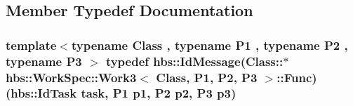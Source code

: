 \subsection{Member Typedef Documentation}
\hypertarget{structhbs_1_1_work_spec_1_1_work3_ac7ae1afe6f16d96d1832caaf6bd4a3d1}{
\subsubsection[{Func}]{\setlength{\rightskip}{0pt plus 5cm}template$<$typename Class , typename P1 , typename P2 , typename P3 $>$ typedef {\bf hbs\-::\-Id\-Message}(Class\-::$\ast$ {\bf hbs\-::\-Work\-Spec\-::\-Work3}$<$ Class, P1, P2, P3 $>$\-::Func)({\bf hbs\-::\-Id\-Task} task, P1 {\bf p1}, P2 {\bf p2}, P3 {\bf p3})}}\label{structhbs_1_1_work_spec_1_1_work3_ac7ae1afe6f16d96d1832caaf6bd4a3d1}


